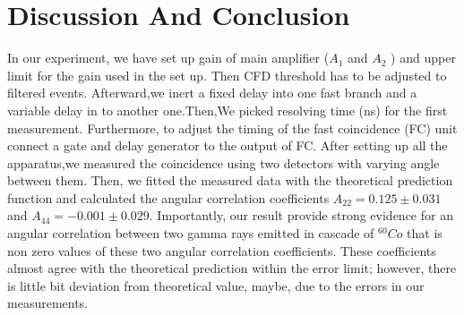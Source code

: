 \section{Discussion And Conclusion}
In our experiment, we have set up gain of main amplifier ($ A_{1} $ and $ A_{2} $ ) and upper limit for the gain used in the set up. Then CFD threshold has to be adjusted to filtered events. Afterward,we inert a fixed delay into one fast branch and a variable delay in to another one.Then,We picked resolving time (ns) for the first measurement. Furthermore, to adjust the timing of the fast coincidence (FC) unit connect a gate and delay generator to the output of FC.
After setting up all the apparatus,we measured the coincidence using two detectors with varying angle between them. Then, we fitted the measured data with the theoretical prediction function and calculated the angular correlation coefficients $ A_{22}= 0.125\pm 0.031 $ and $A_{44}=-0.001\pm 0.029  $. Importantly, our result provide strong evidence for an angular correlation between two gamma rays emitted in cascade of $ ^{60}Co $ that is non zero values of these two angular correlation coefficients. These coefficients almost agree with the theoretical prediction within the error limit; however, there is little bit deviation from theoretical value, maybe,  due to the errors in our measurements. 
